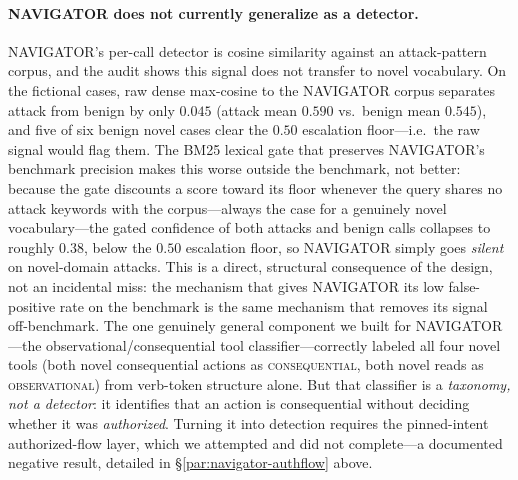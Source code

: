 \documentclass[sigconf,anonymous,review]{acmart}
\begin{document}
\paragraph{NAVIGATOR does not currently generalize as a detector.} NAVIGATOR's
per-call detector is cosine similarity against an attack-pattern corpus, and the
audit shows this signal does not transfer to novel vocabulary. On the fictional
cases, raw dense max-cosine to the NAVIGATOR corpus separates attack from benign
by only $0.045$ (attack mean $0.590$ vs.\ benign mean $0.545$), and five of six
benign novel cases clear the $0.50$ escalation floor---i.e.\ the raw signal would
flag them. The BM25 lexical gate that preserves NAVIGATOR's benchmark precision
makes this worse outside the benchmark, not better: because the gate discounts a
score toward its floor whenever the query shares no attack keywords with the
corpus---always the case for a genuinely novel vocabulary---the gated confidence
of both attacks and benign calls collapses to roughly $0.38$, below the $0.50$
escalation floor, so NAVIGATOR simply goes \emph{silent} on novel-domain attacks.
This is a direct, structural consequence of the design, not an incidental miss:
the mechanism that gives NAVIGATOR its low false-positive rate on the benchmark
is the same mechanism that removes its signal off-benchmark. The one genuinely
general component we built for NAVIGATOR---the observational/consequential tool
classifier---correctly labeled all four novel tools (both novel consequential
actions as \textsc{consequential}, both novel reads as \textsc{observational})
from verb-token structure alone. But that classifier is a \emph{taxonomy, not a
detector}: it identifies that an action is consequential without deciding whether
it was \emph{authorized}. Turning it into detection requires the pinned-intent
authorized-flow layer, which we attempted and did not complete---a documented
negative result, detailed in \S\ref{par:navigator-authflow} above.
\end{document}
